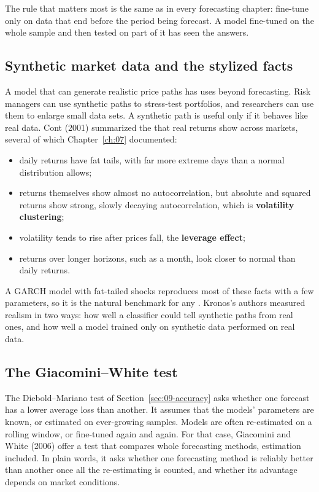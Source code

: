 The rule that matters most is the same as in every forecasting chapter: fine-tune only on data that end before the period being forecast. A model fine-tuned on the whole sample and then tested on part of it has seen the answers.

\subsection{Synthetic market data and the stylized facts}

A model that can generate realistic price paths has uses beyond forecasting. Risk managers can use synthetic paths to stress-test portfolios, and researchers can use them to enlarge small data sets. A synthetic path is useful only if it behaves like real data. Cont (2001) summarized the  that real returns show across markets, several of which Chapter~\ref{ch:07} documented:

\begin{itemize}
  \item daily returns have fat tails, with far more extreme days than a normal distribution allows;
  \item returns themselves show almost no autocorrelation, but absolute and squared returns show strong, slowly decaying autocorrelation, which is \textbf{volatility clustering};
  \item volatility tends to rise after prices fall, the \textbf{leverage effect};
  \item returns over longer horizons, such as a month, look closer to normal than daily returns.
\end{itemize}

A GARCH model with fat-tailed shocks reproduces most of these facts with a few parameters, so it is the natural benchmark for any . Kronos's authors measured realism in two ways: how well a classifier could tell synthetic paths from real ones, and how well a model trained only on synthetic data performed on real data.

\subsection{The Giacomini--White test}

The Diebold--Mariano test of Section~\ref{sec:09-accuracy} asks whether one forecast has a lower average loss than another. It assumes that the models' parameters are known, or estimated on ever-growing samples. Models are often re-estimated on a rolling window, or fine-tuned again and again. For that case, Giacomini and White (2006) offer a test that compares whole forecasting methods, estimation included. In plain words, it asks whether one forecasting method is reliably better than another once all the re-estimating is counted, and whether its advantage depends on market conditions.


